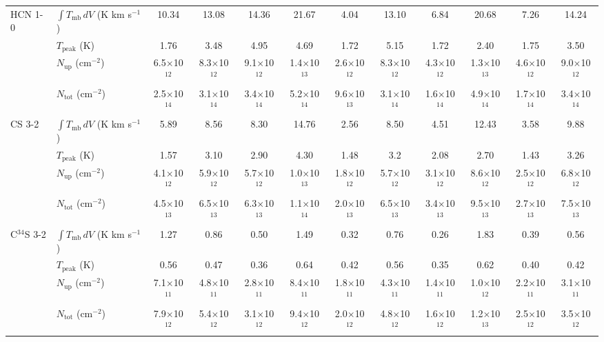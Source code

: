 \documentclass{aa}
\begin{document}
\begin{appendix}
\begin{sidewaystable*}
\begin{tabular}{l l c c c c c c c c c c}
\multirow{4}{*}{HCN 1-0} & $\int{T_{\mathrm{mb}} \, dV}$ (K km s$^{-1}$) & 10.34 & 13.08 & 14.36 & 21.67 & 4.04 & 13.10 & 6.84 & 20.68 & 7.26 & 14.24 \\
& $T_\mathrm{peak}$ (K) & 1.76 & 3.48 & 4.95 & 4.69 & 1.72 & 5.15 & 1.72 & 2.40 & 1.75 & 3.50 \\
& $N_\mathrm{up}$ (cm$^{-2}$) & 6.5$\times$10$^{12}$ & 8.3$\times$10$^{12}$ & 9.1$\times$10$^{12}$ & 1.4$\times$10$^{13}$ & 2.6$\times$10$^{12}$ & 8.3$\times$10$^{12}$ & 4.3$\times$10$^{12}$ & 1.3$\times$10$^{13}$ & 4.6$\times$10$^{12}$ & 9.0$\times$10$^{12}$ \\
& $N_\mathrm{tot}$ (cm$^{-2}$) & 2.5$\times$10$^{14}$ & 3.1$\times$10$^{14}$ & 3.4$\times$10$^{14}$ & 5.2$\times$10$^{14}$ & 9.6$\times$10$^{13}$ & 3.1$\times$10$^{14}$ & 1.6$\times$10$^{14}$ & 4.9$\times$10$^{14}$ & 1.7$\times$10$^{14}$ & 3.4$\times$10$^{14}$\\

\multirow{4}{*}{CS 3-2} & $\int{T_{\mathrm{mb}} \, dV}$ (K km s$^{-1}$) & 5.89 & 8.56 & 8.30 & 14.76 & 2.56 & 8.50 & 4.51 & 12.43 & 3.58 & 9.88 \\
& $T_\mathrm{peak}$ (K) & 1.57 & 3.10 & 2.90 & 4.30 & 1.48 & 3.2 & 2.08 & 2.70 & 1.43 & 3.26 \\
& $N_\mathrm{up}$ (cm$^{-2}$) & 4.1$\times$10$^{12}$ & 5.9$\times$10$^{12}$ & 5.7$\times$10$^{12}$ & 1.0$\times$10$^{13}$ & 1.8$\times$10$^{12}$ & 5.7$\times$10$^{12}$ & 3.1$\times$10$^{12}$ & 8.6$\times$10$^{12}$ & 2.5$\times$10$^{12}$ & 6.8$\times$10$^{12}$ \\
& $N_\mathrm{tot}$ (cm$^{-2}$) & 4.5$\times$10$^{13}$ & 6.5$\times$10$^{13}$ & 6.3$\times$10$^{13}$ & 1.1$\times$10$^{14}$ & 2.0$\times$10$^{13}$ & 6.5$\times$10$^{13}$ & 3.4$\times$10$^{13}$ & 9.5$\times$10$^{13}$ & 2.7$\times$10$^{13}$ & 7.5$\times$10$^{13}$\\

\multirow{4}{*}{C$^{34}$S 3-2} & $\int{T_{\mathrm{mb}} \, dV}$ (K km s$^{-1}$) & 1.27 & 0.86 & 0.50 & 1.49 & 0.32 & 0.76 & 0.26 & 1.83 & 0.39 & 0.56 \\
& $T_\mathrm{peak}$ (K) & 0.56 & 0.47 & 0.36 & 0.64 & 0.42 & 0.56 & 0.35 & 0.62 & 0.40 & 0.42 \\
& $N_\mathrm{up}$ (cm$^{-2}$) & 7.1$\times$10$^{11}$ & 4.8$\times$10$^{11}$ & 2.8$\times$10$^{11}$ & 8.4$\times$10$^{11}$ & 1.8$\times$10$^{11}$ & 4.3$\times$10$^{11}$ & 1.4$\times$10$^{11}$ & 1.0$\times$10$^{12}$ & 2.2$\times$10$^{11}$ & 3.1$\times$10$^{11}$ \\
& $N_\mathrm{tot}$ (cm$^{-2}$) & 7.9$\times$10$^{12}$ & 5.4$\times$10$^{12}$ & 3.1$\times$10$^{12}$ & 9.4$\times$10$^{12}$ & 2.0$\times$10$^{12}$ & 4.8$\times$10$^{12}$ & 1.6$\times$10$^{12}$ & 1.2$\times$10$^{13}$ & 2.5$\times$10$^{12}$ & 3.5$\times$10$^{12}$\\


\end{tabular}
\end{sidewaystable*}
\end{appendix}
\end{document}
